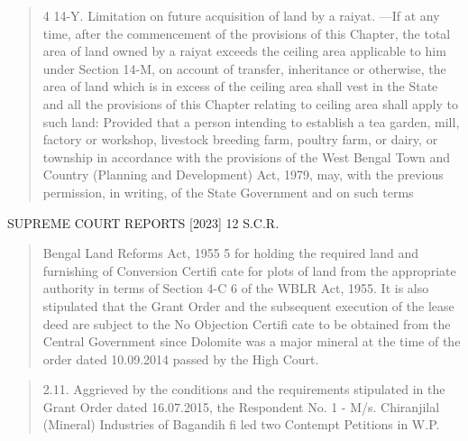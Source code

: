 \documentclass[12pt,a4paper]{article}
\newenvironment{judgequote}
  {\begin{quote}\small}
  {\end{quote}}
\begin{document}
\begin{judgequote}
4 14-Y. Limitation on future acquisition of land by a raiyat. ---If at any time, after
the commencement of the provisions of this Chapter, the total area of land owned by
a raiyat exceeds the ceiling area applicable to him under Section 14-M, on account of
transfer, inheritance or otherwise, the area of land which is in excess of the ceiling area
shall vest in the State and all the provisions of this Chapter relating to ceiling area shall
apply to such land:
Provided that a person intending to establish a tea garden, mill, factory or workshop,
livestock breeding farm, poultry farm, or dairy, or township in accordance with the
provisions of the West Bengal Town and Country (Planning and Development) Act, 1979,
may, with the previous permission, in writing, of the State Government and on such terms
\end{judgequote}



 SUPREME COURT REPORTS [2023] 12 S.C.R.


\begin{judgequote}
Bengal Land Reforms Act, 1955 5 for holding the required land and furnishing
of Conversion Certifi cate for plots of land from the appropriate authority in
terms of Section 4-C 6 of the WBLR Act, 1955. It is also stipulated that the
Grant Order and the subsequent execution of the lease deed are subject to
the No Objection Certifi cate to be obtained from the Central Government
since Dolomite was a major mineral at the time of the order dated 10.09.2014
passed by the High Court.
\end{judgequote}

\begin{judgequote}
2.11. Aggrieved by the conditions and the requirements stipulated in
the Grant Order dated 16.07.2015, the Respondent No. 1 - M/s. Chiranjilal
(Mineral) Industries of Bagandih fi led two Contempt Petitions in W.P.
\end{judgequote}
\end{document}
